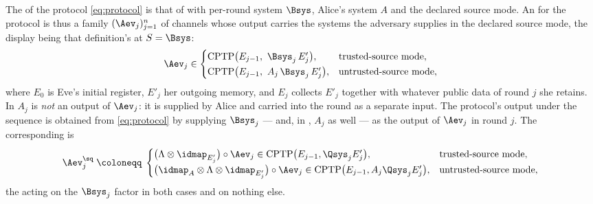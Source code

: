 \begin{definition}
\label{def:roundmodel}
The  of the protocol \eqref{eq:protocol} is that of
 with per-round system $\Bsys$, Alice's
system $A$ and the declared source mode. An  for the
protocol is thus a family $(\Aev_j)_{j=1}^{n}$ of channels whose output carries
the systems the adversary supplies in the declared source mode, the display
being that definition's at $S=\Bsys$:
\begin{equation}\label{eq:attackchannel}
  \Aev_j\in
  \begin{cases}
    \mathrm{CPTP}\big(E_{j-1},\ \Bsys_j\,E'_j\big),
      & \text{trusted-source mode},\\[0.3ex]
    \mathrm{CPTP}\big(E_{j-1},\ A_j\,\Bsys_j\,E'_j\big),
      & \text{untrusted-source mode},
  \end{cases}
\end{equation}
where $E_0$ is Eve's initial register, $E'_j$ her outgoing memory, and $E_j$
collects $E'_j$ together with whatever public data of round $j$ she retains. In
 $A_j$ is \emph{not} an output of $\Aev_j$: it is
supplied by Alice and carried into the round as a separate input. The
protocol's output under the sequence is obtained from \eqref{eq:protocol} by
supplying $\Bsys_j$ --- and, in , $A_j$ as well
--- as the output of $\Aev_j$ in round $j$. The corresponding
 is
\begin{equation}\label{eq:composite}
  \Aev^{\sq}_j\;\coloneqq\;
  \begin{cases}
    \big(\Lambda\otimes\idmap_{E'_j}\big)\circ\Aev_j
      \in\mathrm{CPTP}\big(E_{j-1},\Qsys_jE'_j\big),
      & \text{trusted-source mode},\\[0.3ex]
    \big(\idmap_{A}\otimes\Lambda\otimes\idmap_{E'_j}\big)\circ\Aev_j
      \in\mathrm{CPTP}\big(E_{j-1},A_j\Qsys_jE'_j\big),
      & \text{untrusted-source mode},
  \end{cases}
\end{equation}
the  acting on the $\Bsys_j$ factor in both cases and
on nothing else.


\end{definition}
